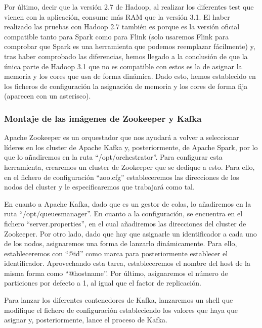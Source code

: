 Por último, decir que la versión 2.7 de Hadoop, al realizar los diferentes test que vienen con la aplicación, consume más RAM que la versión 3.1. El haber realizado las pruebas con Hadoop 2.7 también es porque es la versión oficial compatible tanto para Spark como para Flink (solo usaremos Flink para comprobar que Spark es una herramienta que podemos reemplazar fácilmente) y, tras haber comprobado las diferencias, hemos llegado a la conclusión de que la única parte de Hadoop 3.1 que no es compatible con estos es la de asignar la memoria y los cores que usa de forma dinámica. Dado esto, hemos establecido en los ficheros de configuración la asignación de memoria y los cores de forma fija (aparecen con un asterisco).\par


\subsubsection {Montaje de las imágenes de Zookeeper y Kafka\label{montKafka}}
Apache Zookeeper es un orquestador que nos ayudará a volver a seleccionar líderes en los cluster de Apache Kafka y, posteriormente, de Apache Spark, por lo que lo añadiremos en la ruta “/opt/orchestrator”. Para configurar esta herramienta, crearemos un cluster de Zookeeper que se dedique a esto. Para ello, en el fichero de configuración “zoo.cfg” estableceremos las direcciones de los nodos del cluster y le especificaremos que trabajará como tal.\par

En cuanto a Apache Kafka, dado que es un gestor de colas, lo añadiremos en la ruta “/opt/queuesmanager”. En cuanto a la configuración, se encuentra en el fichero “server.properties”, en el cual añadiremos las direcciones del cluster de Zookeeper. Por otro lado, dado que hay que asignarle un identificador a cada uno de los nodos, asignaremos una forma de lanzarlo dinámicamente. Para ello, estableceremos con “@id” como marca para posteriormente establecer el identificador. Aprovechando esta tarea, estableceremos el nombre del host de la misma forma como “@hostname”.  Por último, asignaremos el número de particiones por defecto a 1, al igual que el factor de replicación.\par

Para lanzar los diferentes contenedores de Kafka, lanzaremos un shell que modifique el fichero de configuración estableciendo los valores que haya que asignar y, posteriormente, lance el proceso de Kafka.\par


